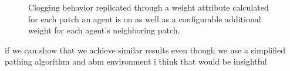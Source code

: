 \documentclass[12pt,letterpaper]{article}
\begin{document}
\begin{figure}[!htbp]
  \centering
  \hfill
  \caption{Clogging behavior replicated through a weight attribute calculated for each patch an agent is on as well as a configurable additional weight for each agent's neighboring patch. }
\end{figure}


if we can show that we achieve similar results even though we use a simplified pathing algorithm and abm environment i think that would be insightful
\end{document}
